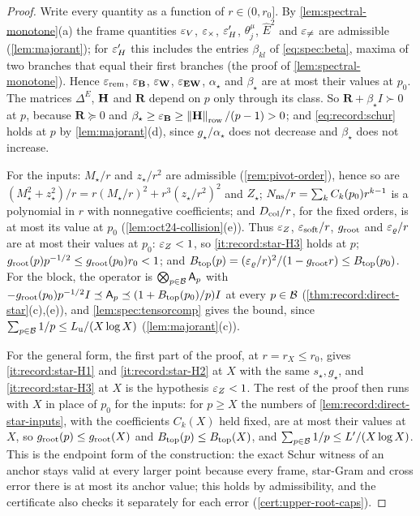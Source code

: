 \begin{proof}
Write every quantity as a function of $r\in(0,r_0]$. By
\cref{lem:spectral-monotone}(a) the frame quantities $\varepsilon_V$, $\varepsilon_\times$,
$\varepsilon'_H$, $\theta^\mu_j$, $\hat E^2$ and $\varepsilon_{\ne}$ are admissible
(\cref{lem:majorant}); for $\varepsilon'_H$ this includes the entries $\beta_{kl}$ of
\eqref{eq:spec:beta}, maxima of two branches that equal their first branches (the
proof of \cref{lem:spectral-monotone}).
Hence $\varepsilon_{\rm rem}$, $\varepsilon_{\mathbf B}$, $\varepsilon_{\mathbf W}$, $\varepsilon_{\mathbf{EW}}$,
$\alpha_\star$ and $\beta_\star$ are at most their values at $p_0$. The matrices
$\Delta^E$, $\mathbf H$ and $\mathbf R$ depend on $p$ only through its class. So
$\mathbf R+\beta_\star I\succ0$ at $p$, because $\mathbf R\succeq0$ and
$\beta_\star\ge\varepsilon_{\mathbf B}\ge\left\|\mathbf H\right\|_{\rm row}/(p-1)>0$; and
\eqref{eq:record:schur} holds at $p$ by \cref{lem:majorant}(d), since
$g_\star/\alpha_\star$ does not decrease and $\beta_\star$ does not increase.

For the inputs: $M_\star/r$ and $z_\star/r^2$ are admissible
(\cref{rem:pivot-order}), hence so are $(M_\star^2+z_\star^2)/r=r(M_\star/r)^2
+r^3(z_\star/r^2)^2$ and $Z_\star$; $N_{\rm ns}/r=\sum_kC_k(p_0)r^{k-1}$ is a
polynomial in $r$ with nonnegative coefficients; and $D_{\rm col}/r$, for the fixed
orders, is at most its value at $p_0$ (\cref{lem:oct24-collision}(e)). Thus
$\varepsilon_Z$, $\varepsilon_{\rm soft}/r$, $g_{\rm root}$ and $\varepsilon_\varrho/r$ are at most their
values at $p_0$: $\varepsilon_Z<1$, so \ref{it:record:star-H3} holds at $p$;
$g_{\rm root}(p)p^{-1/2}\le g_{\rm root}(p_0)r_0<1$; and
$B_{\rm top}(p)=(\varepsilon_\varrho/r)^2/(1-g_{\rm root}r)\le B_{\rm top}(p_0)$. For the
block, the operator is $\bigotimes_{p\in\mathcal B}\mathsf A_p$ with
$-g_{\rm root}(p_0)p^{-1/2}I\preceq\mathsf A_p\preceq(1+B_{\rm top}(p_0)/p)I$ at every $p\in\mathcal B$
(\cref{thm:record:direct-star}(c),(e)), and
\cref{lem:spec:tensorcomp} gives the bound, since
$\sum_{p\in\mathcal B}1/p\le L_{\rm u}/(X\log X)$ (\cref{lem:majorant}(c)).

For the general form, the first part of the proof, at $r=r_X\le r_0$, gives
\ref{it:record:star-H1} and \ref{it:record:star-H2} at $X$ with the same
$s_\star,g_\star$, and \ref{it:record:star-H3} at $X$ is the hypothesis $\varepsilon_Z<1$.
The rest of the proof then runs with $X$ in place of $p_0$ for the inputs: for
$p\ge X$ the numbers of \cref{lem:record:direct-star-inputs}, with the coefficients
$C_k(X)$ held fixed, are at most their values at $X$, so $g_{\rm root}(p)\le
g_{\rm root}(X)$ and $B_{\rm top}(p)\le B_{\rm top}(X)$, and
$\sum_{p\in\mathcal B}1/p\le L'/(X\log X)$. This is the endpoint form of the
construction: the exact Schur witness of an anchor stays valid at every larger
point because every frame, star-Gram and cross error there is at most its anchor
value; this holds by admissibility, and the certificate also checks it separately
for each error (\cref{cert:upper-root-caps}).
\end{proof}

